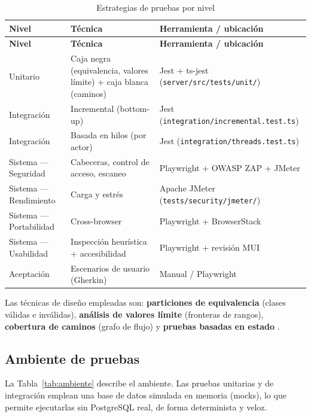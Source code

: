 \documentclass[stu,11pt,floatsintext]{apa7}
\begin{document}
\begin{longtable}{L{0.20\textwidth} L{0.34\textwidth} L{0.38\textwidth}}
\caption{Estrategias de pruebas por nivel}\label{tab:estrategias}\\
\toprule
\textbf{Nivel} & \textbf{Técnica} & \textbf{Herramienta / ubicación} \\
\midrule
\endfirsthead
\toprule
\textbf{Nivel} & \textbf{Técnica} & \textbf{Herramienta / ubicación} \\
\midrule
\endhead
\bottomrule
\endlastfoot
Unitario & Caja negra (equivalencia, valores límite) + caja blanca (caminos) & Jest + ts-jest (\texttt{server/src/tests/unit/}) \\
Integración & Incremental (bottom-up) & Jest (\texttt{integration/incremental.test.ts}) \\
Integración & Basada en hilos (por actor) & Jest (\texttt{integration/threads.test.ts}) \\
Sistema — Seguridad & Cabeceras, control de acceso, escaneo & Playwright + OWASP ZAP + JMeter \\
Sistema — Rendimiento & Carga y estrés & Apache JMeter (\texttt{tests/security/jmeter/}) \\
Sistema — Portabilidad & Cross-browser & Playwright + BrowserStack \\
Sistema — Usabilidad & Inspección heurística + accesibilidad & Playwright + revisión MUI \\
Aceptación & Escenarios de usuario (Gherkin) & Manual / Playwright \\
\end{longtable}

Las técnicas de diseño empleadas son: \textbf{particiones de equivalencia} (clases
válidas e inválidas), \textbf{análisis de valores límite} (fronteras de rangos),
\textbf{cobertura de caminos} (grafo de flujo) y \textbf{pruebas basadas en estado}
\parencite{myers2011,beizer1990}.

\subsection{Ambiente de pruebas}\label{sec:ambiente}
La Tabla~\ref{tab:ambiente} describe el ambiente. Las pruebas unitarias y de integración
emplean una base de datos simulada en memoria (mocks), lo que permite ejecutarlas sin
PostgreSQL real, de forma determinista y veloz.
\end{document}
